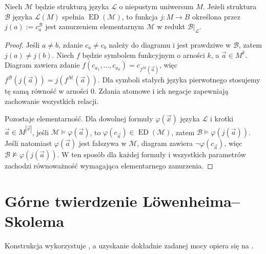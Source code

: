 \begin{lemat}
\label{lem:ls-diagram-embedding}
Niech $\mathcal M$ będzie strukturą języka
$\mathcal L$ o niepustym uniwersum $M$.
Jeżeli struktura $\mathcal B$ języka $\mathcal L(M)$
spełnia $\operatorname{ED}(\mathcal M)$,
to funkcja $j:M\to B$ określona przez
$j(a):=c_a^{\mathcal B}$
jest zanurzeniem elementarnym
$\mathcal M$ w redukt $\mathcal B|_{\mathcal L}$.
\end{lemat}
\begin{proof}
Jeśli $a\ne b$, zdanie $c_a\ne c_b$
należy do diagramu i jest prawdziwe w $\mathcal B$,
zatem $j(a)\ne j(b)$.
Niech $f$ będzie symbolem funkcyjnym
o arności $k$, a $\vec a\in M^k$.
Diagram zawiera zdanie
$f(c_{a_1},\ldots,c_{a_k})=
c_{f^{\mathcal M}(\vec a)}$,
więc
$f^{\mathcal B}(j(\vec a))=
j(f^{\mathcal M}(\vec a))$.
Dla symboli stałych języka pierwotnego
stosujemy tę samą równość w arności $0$.
Zdania atomowe i ich negacje zapewniają
zachowanie wszystkich relacji.

Pozostaje elementarność. Dla dowolnej formuły
$\varphi(\vec x)$ języka $\mathcal L$
i krotki $\vec a\in M^{|\vec x|}$,
jeśli $\mathcal M\models\varphi(\vec a)$,
to $\varphi(c_{\vec a})\in
\operatorname{ED}(\mathcal M)$,
zatem $\mathcal B\models\varphi(j(\vec a))$.
Jeśli natomiast $\varphi(\vec a)$ jest fałszywa
w $\mathcal M$, diagram zawiera
$\neg\varphi(c_{\vec a})$,
więc $\mathcal B\not\models\varphi(j(\vec a))$.
W ten sposób dla każdej formuły i wszystkich
parametrów zachodzi równoważność wymagająca
elementarnego zanurzenia.
\end{proof}

\section{Górne twierdzenie Löwenheima--Skolema}
Konstrukcja wykorzystuje , a uzyskanie dokładnie zadanej mocy opiera się na .

